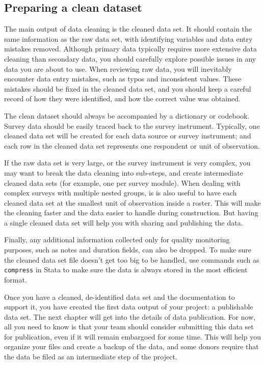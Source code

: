 \subsection{Preparing a clean dataset}
The main output of data cleaning is the cleaned data set.
It should contain the same information as the raw data set,
with identifying variables and data entry mistakes removed.
Although primary data typically requires more extensive data cleaning than secondary data,
you should carefully explore possible issues in any data you are about to use.
When reviewing raw data, you will inevitably encounter data entry mistakes,
such as typos and inconsistent values.
These mistakes should be fixed in the cleaned data set,
and you should keep a careful record of how they were identified,
and how the correct value was obtained.

The clean dataset should always be accompanied by a dictionary or codebook.
Survey data should be easily traced back to the survey instrument.
Typically, one cleaned data set will be created for each data source
or survey instrument; and each row in the cleaned data set represents one
respondent or unit of observation.\cite{tidy-data}

If the raw data set is very large, or the survey instrument is very complex,
you may want to break the data cleaning into sub-steps,
and create intermediate cleaned data sets
(for example, one per survey module).
When dealing with complex surveys with multiple nested groups,
is is also useful to have each cleaned data set at the smallest unit of observation inside a roster.
This will make the cleaning faster and the data easier to handle during construction.
But having a single cleaned data set will help you with sharing and publishing the data.

Finally, any additional information collected only for quality monitoring purposes,
such as notes and duration fields, can also be dropped.
To make sure the cleaned data set file doesn't get too big to be handled,
use commands such as \texttt{compress} in Stata to make sure the data
is always stored in the most efficient format.

Once you have a cleaned, de-identified data set and the documentation to support it,
you have created the first data output of your project: a publishable data set.
The next chapter will get into the details of data publication.
For now, all you need to know is that your team should consider submitting this data set for publication,
even if it will remain embargoed for some time.
This will help you organize your files and create a backup of the data,
and some donors require that the data be filed as an intermediate step of the project.


